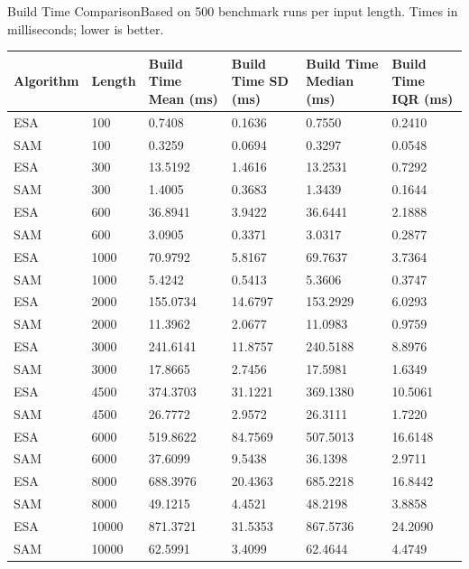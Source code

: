 \begin{benchmarktable}{Build Time Comparison}{Based on 500 benchmark runs per input length. Times in milliseconds; lower is better.}
\begin{tabularx}{\textwidth}{|X|X|X|X|X|X|}
\toprule
Algorithm & Length & Build Time Mean (ms) & Build Time SD (ms) & Build Time Median (ms) & Build Time IQR (ms) \\
\midrule
ESA & 100 & 0.7408 & 0.1636 & 0.7550 & 0.2410 \\
SAM & 100 & 0.3259 & 0.0694 & 0.3297 & 0.0548 \\
\hline
ESA & 300 & 13.5192 & 1.4616 & 13.2531 & 0.7292 \\
SAM & 300 & 1.4005 & 0.3683 & 1.3439 & 0.1644 \\
\hline
ESA & 600 & 36.8941 & 3.9422 & 36.6441 & 2.1888 \\
SAM & 600 & 3.0905 & 0.3371 & 3.0317 & 0.2877 \\
\hline
ESA & 1000 & 70.9792 & 5.8167 & 69.7637 & 3.7364 \\
SAM & 1000 & 5.4242 & 0.5413 & 5.3606 & 0.3747 \\
\hline
ESA & 2000 & 155.0734 & 14.6797 & 153.2929 & 6.0293 \\
SAM & 2000 & 11.3962 & 2.0677 & 11.0983 & 0.9759 \\
\hline
ESA & 3000 & 241.6141 & 11.8757 & 240.5188 & 8.8976 \\
SAM & 3000 & 17.8665 & 2.7456 & 17.5981 & 1.6349 \\
\hline
ESA & 4500 & 374.3703 & 31.1221 & 369.1380 & 10.5061 \\
SAM & 4500 & 26.7772 & 2.9572 & 26.3111 & 1.7220 \\
\hline
ESA & 6000 & 519.8622 & 84.7569 & 507.5013 & 16.6148 \\
SAM & 6000 & 37.6099 & 9.5438 & 36.1398 & 2.9711 \\
\hline
ESA & 8000 & 688.3976 & 20.4363 & 685.2218 & 16.8442 \\
SAM & 8000 & 49.1215 & 4.4521 & 48.2198 & 3.8858 \\
\hline
ESA & 10000 & 871.3721 & 31.5353 & 867.5736 & 24.2090 \\
SAM & 10000 & 62.5991 & 3.4099 & 62.4644 & 4.4749 \\
\bottomrule
\end{tabularx}
\end{benchmarktable}

